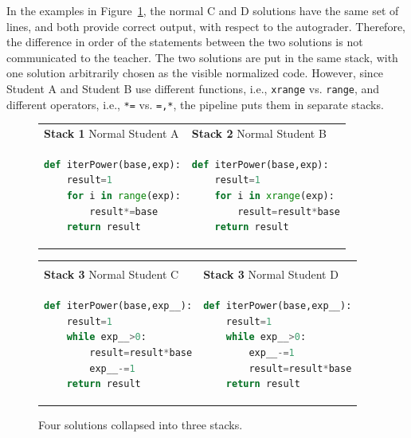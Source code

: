 \documentclass[12pt,twoside]{mitthesis}
\newcommand \codevar[1]{\texttt{#1}}
\begin{document}
In the examples in Figure~\ref{fig:makingstacks}, the normal C and D solutions have the same set of lines, and both provide correct output, with respect to the autograder. Therefore, the difference in order of the statements between the two solutions is not communicated to the teacher. The two solutions are put in the same stack, with one solution arbitrarily chosen as the visible normalized code. However, since Student A and Student B use different functions, i.e., \codevar{xrange} vs. \codevar{range}, and different operators, i.e., \codevar{*=} vs. \codevar{=,*}, the pipeline puts them in separate stacks.
\begin{figure}
\begin{tabular}{l|l}
{\bf Stack 1} Normal Student A & {\bf Stack 2} Normal Student B  \\
\begin{minipage}{0.5\linewidth}
\begin{lstlisting}[basicstyle=\linespread{1.0}\ttfamily\footnotesize,language=python,linebackgroundcolor={\lstcolorlines[gray!20]{3,4}}]
def iterPower(base,exp):
    result=1
    for i in range(exp):
        result*=base
    return result
\end{lstlisting}
\end{minipage}
&
\begin{minipage}{0.5\linewidth}
\begin{lstlisting}[basicstyle=\linespread{1.0}\ttfamily\footnotesize,language=python,linebackgroundcolor={\lstcolorlines[gray!20]{3,4}}]
def iterPower(base,exp):
    result=1
    for i in xrange(exp):
        result=result*base
    return result
\end{lstlisting}
\end{minipage}
\end{tabular}
\begin{tabular}{ll}
\hline
\\
{\bf Stack 3} Normal Student C & {\bf Stack 3} Normal Student D  \\
\begin{minipage}{0.5\linewidth}
\begin{lstlisting}[basicstyle=\linespread{1.0}\ttfamily\footnotesize,language=python,linebackgroundcolor={\lstcolorlines[mygray]{4,5}}]
def iterPower(base,exp__):
    result=1
    while exp__>0:
        result=result*base
        exp__-=1
    return result
\end{lstlisting}
\end{minipage}
&
\begin{minipage}{0.5\linewidth}
\begin{lstlisting}[basicstyle=\linespread{1.0}\ttfamily\footnotesize,language=python,linebackgroundcolor={\lstcolorlines[mygray]{4,5}}]
def iterPower(base,exp__):
    result=1
    while exp__>0:
        exp__-=1
        result=result*base
    return result
\end{lstlisting}
\end{minipage}
\end{tabular}
\caption{Four solutions collapsed into three stacks.}
\label{fig:makingstacks}
\end{figure}
\end{document}
